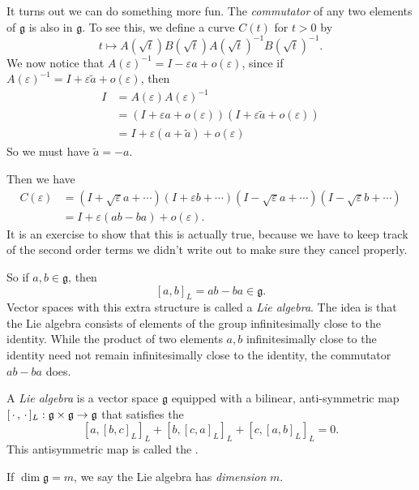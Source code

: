 \documentclass[a4paper]{article}
\begin{document}
It turns out we can do something more fun. The \emph{commutator} of any two elements of $\mathfrak{g}$ is also in $\mathfrak{g}$. To see this, we define a curve $C(t)$ for $t > 0$ by
\[
  t \mapsto A(\sqrt{t}) B(\sqrt{t}) A(\sqrt{t})^{-1} B(\sqrt{t})^{-1}.
\]
We now notice that $A(\varepsilon)^{-1} = I - \varepsilon a + o(\varepsilon)$, since if $A(\varepsilon)^{-1} = I + \varepsilon \tilde{a} + o(\varepsilon)$, then
\begin{align*}
  I &= A(\varepsilon) A(\varepsilon)^{-1}\\
  &= (I + \varepsilon a + o(\varepsilon))(I + \varepsilon \tilde{a} + o(\varepsilon))\\
  &= I + \varepsilon(a + \tilde{a}) + o(\varepsilon)
\end{align*}
So we must have $\tilde{a} = -a$.

Then we have
\begin{align*}
  C(\varepsilon) &= (I + \sqrt{\varepsilon} a + \cdots)(I + \varepsilon b + \cdots) (I - \sqrt{\varepsilon} a + \cdots )(I - \sqrt{\varepsilon} b + \cdots)\\
  &= I + \varepsilon(ab - ba) + o(\varepsilon).
\end{align*}
It is an exercise to show that this is actually true, because we have to keep track of the second order terms we didn't write out to make sure they cancel properly.

So if $a, b \in \mathfrak{g}$, then
\[
  [a, b]_L = ab - ba \in \mathfrak{g}.
\]
Vector spaces with this extra structure is called a \emph{Lie algebra}. The idea is that the Lie algebra consists of elements of the group infinitesimally close to the identity. While the product of two elements $a, b$ infinitesimally close to the identity need not remain infinitesimally close to the identity, the commutator $ab - ba$ does.

\begin{defi}
  A \emph{Lie algebra} is a vector space $\mathfrak{g}$ equipped with a bilinear, anti-symmetric map $[\,\cdot\,, \,\cdot\,]_L: \mathfrak{g} \times \mathfrak{g} \to \mathfrak{g}$ that satisfies the 
  \[
    [a, [b, c]_L]_L + [b, [c, a]_L]_L + [c, [a, b]_L]_L = 0.
  \]
  This antisymmetric map is called the .

  If $\dim \mathfrak{g} = m$, we say the Lie algebra has \emph{dimension} $m$.
\end{defi}
\end{document}
